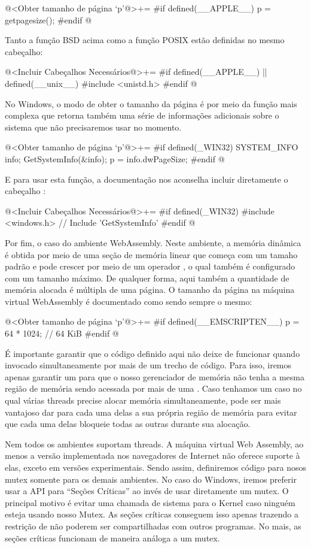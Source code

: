 \iniciocodigo
@<Obter tamanho de página `p'@>+=
#if defined(__APPLE__)
p = getpagesize();
#endif
@
\fimcodigo

Tanto a função BSD acima como a função POSIX estão definidas no mesmo
cabeçalho:

\iniciocodigo
@<Incluir Cabeçalhos Necessários@>+=
#if defined(__APPLE__) || defined(__unix__)
#include <unistd.h>
#endif
@
\fimcodigo

No Windows, o modo de obter o tamanho da página é por meio da função
mais complexa  que retorna também uma série
de informações adicionais sobre o sistema que não precisaremos usar no
momento.

\iniciocodigo
@<Obter tamanho de página `p'@>+=
#if defined(_WIN32)
{
  SYSTEM_INFO info;
  GetSystemInfo(&info);
  p = info.dwPageSize;
}
#endif
@
\fimcodigo

E para usar esta função, a documentação nos aconselha incluir
diretamente o cabeçalho :

\iniciocodigo
@<Incluir Cabeçalhos Necessários@>+=
#if defined(_WIN32)
#include <windows.h> // Include 'GetSystemInfo'
#endif
@
\fimcodigo


Por fim, o caso do ambiente WebAssembly. Neste ambiente, a memória
dinâmica é obtida por meio de uma seção de memória linear que começa
com um tamaho padrão e pode crescer por meio de um
operador , o qual também é configurado com um
tamanho máximo. De qualquer forma, aqui também a quantidade de memória
alocada é múltipla de uma página. O tamanho da página na máquina
virtual WebAssembly é documentado como sendo sempre o mesmo:

\iniciocodigo
@<Obter tamanho de página `p'@>+=
#if defined(__EMSCRIPTEN__)
p = 64 * 1024; // 64 KiB
#endif
@
\fimcodigo


É importante garantir que o código definido aqui não deixe de
funcionar quando invocado simultaneamente por mais de um trecho de
código. Para isso, iremos apenas garantir um  para que
o nosso gerenciador de memória não tenha a mesma região de memória
sendo acessada por mais de uma . Caso tenhamos um caso
no qual várias threads precise alocar memória simultaneamente, pode
ser mais vantajoso dar para cada uma delas a sua própria região de
memória para evitar que cada uma delas bloqueie todas as outras
durante sua alocação.

Nem todos os ambientes suportam threads. A máquina virtual Web
Assembly, ao menos a versão implementada nos navegadores de Internet
não oferece suporte à elas, exceto em versões experimentais. Sendo
assim, definiremos código para nosos mutex somente para os demais
ambientes. No caso do Windows, iremos preferir usar a API para
``Seções Críticas'' ao invés de usar diretamente um mutex. O principal
motivo é evitar uma chamada de sistema para o Kernel caso ninguém
esteja usando nosso Mutex. As seções críticas conseguem isso apenas
trazendo a restrição de não poderem ser compartilhadas com outros
programas. No mais, as seções críticas funcionam de maneira análoga a
um mutex.

